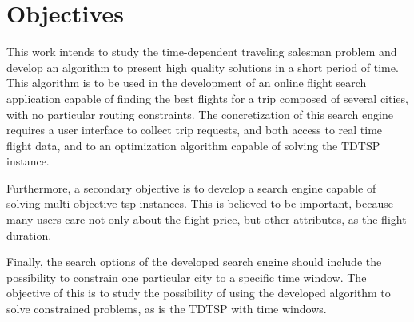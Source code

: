 \section{Objectives}

This work intends to study the time-dependent traveling salesman problem and develop an algorithm
to present high quality solutions in a short period of time. This algorithm is to be used 
in the development of an online flight search application capable of finding the best flights 
for a trip composed of several cities, with no particular routing constraints. 
The concretization of this search engine requires a user interface to collect trip requests,
and both access to real time flight data, and to an optimization
algorithm capable of solving the TDTSP instance.

Furthermore, a secondary objective is to develop a search engine capable of solving 
multi-objective tsp instances. This is believed to be important, because many users care not only about the flight price,
but other attributes, as the flight duration.

Finally, the search options of the developed search engine should include the possibility
to constrain one particular city to a specific time window. The objective of this is to study 
the possibility of using the developed algorithm to solve constrained problems,
as is the TDTSP with time windows.



